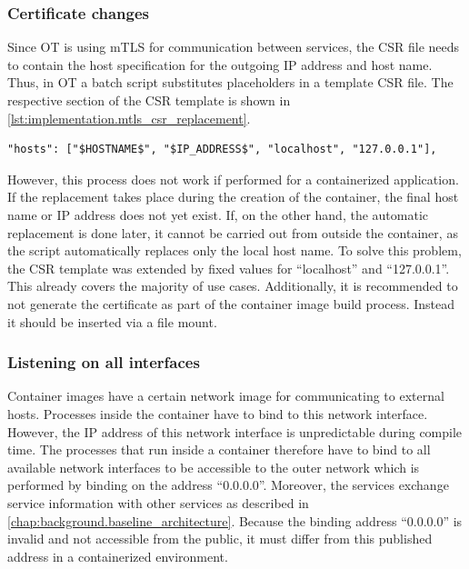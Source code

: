 \subsubsection*{Certificate changes}
Since \ac{OT} is using \ac{mTLS} for communication between services, the \ac{CSR} file needs to contain the host specification for the outgoing \ac{IP} address and host name. Thus, in \ac{OT} a batch script substitutes placeholders in a template \ac{CSR} file. The respective section of the \ac{CSR} template is shown in \autoref{lst:implementation.mtls_csr_replacement}.
\begin{lstlisting}[label=lst:implementation.mtls_csr_replacement, caption={Variables defined in the \ac{CSR} are substituted by their respective values. (\textit{/Deployment/\hspace{0.01em}Certificates/server-csr\_template.json})}, language={}, firstnumber=3]
  "hosts": ["$HOSTNAME$", "$IP_ADDRESS$", "localhost", "127.0.0.1"],
\end{lstlisting}
However, this process does not work if performed for a containerized application. If the replacement takes place during the creation of the container, the final host name or \ac{IP} address does not yet exist. If, on the other hand, the automatic replacement is done later, it cannot be carried out from outside the container, as the script automatically replaces only the local host name.
To solve this problem, the \ac{CSR} template was extended by fixed values for \enquote{localhost} and \enquote{127.0.0.1}. This already covers the majority of use cases. Additionally, it is recommended to not generate the certificate as part of the container image build process. Instead it should be inserted via a file mount.

\subsubsection*{Listening on all interfaces}
Container images have a certain network image for communicating to external hosts. Processes inside the container have to bind to this network interface. However, the \ac{IP} address of this network interface is unpredictable during compile time. The processes that run inside a container therefore have to bind to all available network interfaces to be accessible to the outer network which is performed by binding on the address \enquote{0.0.0.0}.
Moreover, the services exchange service information with other services as described in \autoref{chap:background.baseline_architecture}. Because the binding address \enquote{0.0.0.0} is invalid and not accessible from the public, it must differ from this published address in a containerized environment.

